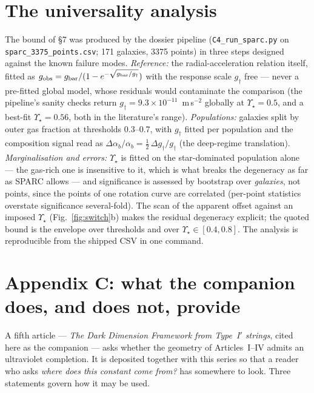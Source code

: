 \appendix
\section{The universality analysis}
The bound of \S7 was produced by the dossier pipeline (\texttt{C4\_run\_sparc.py} on \texttt{sparc\_3375\_points.csv}; 171 galaxies, 3375 points) in three steps designed against the known failure modes. \emph{Reference:} the radial-acceleration relation itself, fitted as $g_{\rm obs}=g_{\rm bar}/(1-e^{-\sqrt{g_{\rm bar}/g_{\dagger}}})$ with the response scale $g_{\dagger}$ free --- never a pre-fitted global model, whose residuals would contaminate the comparison (the pipeline's sanity checks return $g_{\dagger}=9.3\times10^{-11}$~m\,s$^{-2}$ globally at $\Upsilon_{\star}=0.5$, and a best-fit $\Upsilon_{\star}=0.56$, both in the literature's range). \emph{Populations:} galaxies split by outer gas fraction at thresholds 0.3--0.7, with $g_{\dagger}$ fitted per population and the composition signal read as $\Delta\alpha_{b}/\alpha_{b}=\tfrac{1}{2}\,\Delta g_{\dagger}/g_{\dagger}$ (the deep-regime translation). \emph{Marginalisation and errors:} $\Upsilon_{\star}$ is fitted on the star-dominated population alone --- the gas-rich one is insensitive to it, which is what breaks the degeneracy as far as SPARC allows --- and significance is assessed by bootstrap over \emph{galaxies}, not points, since the points of one rotation curve are correlated (per-point statistics overstate significance several-fold). The scan of the apparent offset against an imposed $\Upsilon_{\star}$ (Fig.~\ref{fig:switch}b) makes the residual degeneracy explicit; the quoted bound is the envelope over thresholds and over $\Upsilon_{\star}\in[0.4,0.8]$. The analysis is reproducible from the shipped CSV in one command.



\toolsstatement
{}


\section*{Appendix C: what the companion does, and does not, provide}
\label{app:companion}

A fifth article --- \emph{The Dark Dimension Framework from Type~I$'$ strings}, cited here as the companion --- asks whether the geometry of Articles~I--IV admits an ultraviolet completion. It is deposited together with this series so that a reader who asks \emph{where does this constant come from?} has somewhere to look. Three statements govern how it may be used.


